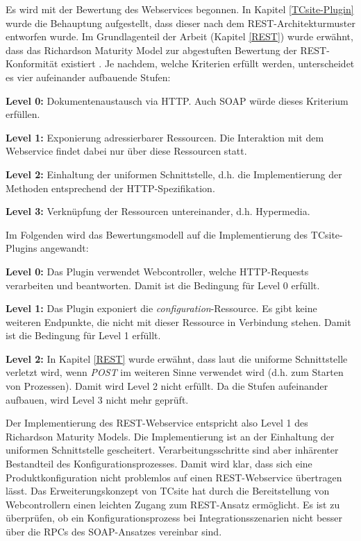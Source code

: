 \documentclass[11pt, a4paper, titlepage, listof=totoc, bibliography=totoc, index=totoc, twoside, openright, headings=normal]{scrreprt}
\begin{document}
Es wird mit der Bewertung des Webservices begonnen. In Kapitel \ref{TCsite-Plugin} wurde die Behauptung aufgestellt, dass dieser nach dem REST-Architekturmuster entworfen wurde. Im Grundlagenteil der Arbeit (Kapitel \ref{REST}) wurde erwähnt, dass das \glqq Richardson Maturity Model\grqq{} zur abgestuften Bewertung der REST-Konformität existiert \citep{wilde11}. Je nachdem, welche Kriterien erfüllt werden, unterscheidet es vier aufeinander aufbauende Stufen:
\begin{compactitem}
\item\textbf{Level 0:} Dokumentenaustausch via HTTP. Auch SOAP würde dieses Kriterium erfüllen.
\item\textbf{Level 1:} Exponierung adressierbarer Ressourcen. Die Interaktion mit dem Webservice findet dabei nur über diese Ressourcen statt.
\item\textbf{Level 2:} Einhaltung der uniformen Schnittstelle, d.h. die Implementierung der Methoden entsprechend der HTTP-Spezifikation.
\item\textbf{Level 3:} Verknüpfung der Ressourcen untereinander, d.h. Hypermedia.
\end{compactitem}

Im Folgenden wird das Bewertungsmodell auf die Implementierung des TCsite-Plugins angewandt:
\begin{compactitem}
\item\textbf{Level 0:} Das Plugin verwendet Webcontroller, welche HTTP-Requests verarbeiten und beantworten. Damit ist die Bedingung für Level 0 erfüllt.
\item\textbf{Level 1:} Das Plugin exponiert die \emph{configuration}-Ressource. Es gibt keine weiteren Endpunkte, die nicht mit dieser Ressource in Verbindung stehen. Damit ist die Bedingung für Level 1 erfüllt.
\item\textbf{Level 2:} In Kapitel \ref{REST} wurde erwähnt, dass laut \citet{richardson07} die uniforme Schnittstelle verletzt wird, wenn \emph{POST} im weiteren Sinne verwendet wird (d.h. zum Starten von Prozessen). Damit wird Level 2 nicht erfüllt. Da die Stufen aufeinander aufbauen, wird Level 3 nicht mehr geprüft.
\end{compactitem}

Der Implementierung des REST-Webservice entspricht also Level 1 des \glqq Richardson Maturity Models\grqq{}. Die Implementierung ist an der Einhaltung der uniformen Schnittstelle gescheitert. Verarbeitungsschritte sind aber inhärenter Bestandteil des Konfigurationsprozesses. Damit wird klar, dass sich eine Produktkonfiguration nicht problemlos auf einen REST-Webservice übertragen lässt. Das Erweiterungskonzept von TCsite hat durch die Bereitstellung von Webcontrollern einen leichten Zugang zum REST-Ansatz ermöglicht. Es ist zu überprüfen, ob ein Konfigurationsprozess bei Integrationsszenarien nicht besser über die RPCs des SOAP-Ansatzes vereinbar sind.
\end{document}
